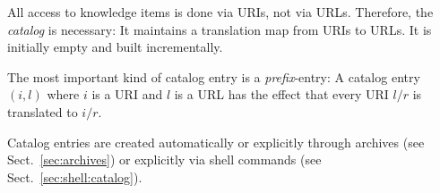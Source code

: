 All access to {\mmt} knowledge items is done via URIs, not via URLs.
Therefore, the \emph{catalog} is necessary: It maintains a translation map from URIs to URLs.
It is initially empty and built incrementally.

The most important kind of catalog entry is a \emph{prefix}-entry: A catalog entry $(i,l)$ where $i$ is a URI and $l$ is a URL has the effect that every {\mmt}  URI $l/r$ is translated to $i/r$.

Catalog entries are created automatically or explicitly through archives (see Sect.~\ref{sec:archives}) or explicitly via shell commands (see Sect.~\ref{sec:shell:catalog}).